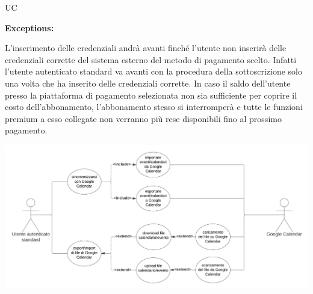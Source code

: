 \begin{listaPersonale}{UC}
\begin{listaPersonale2}[UC] {}
        \textbf{Exceptions:}
        \begin{enumerate}[label=\textbf{[exception \arabic{enumiii}]}, ref= \textbf{[exception \arabic{enumiii}]}]
             L'inserimento delle credenziali andrà avanti finché l'utente non inserirà delle credenziali corrette del sistema esterno del metodo di pagamento scelto. Infatti l'utente autenticato standard va avanti con la procedura della sottoscrizione solo una volta che ha inserito delle credenziali corrette.
             In caso il saldo dell'utente presso la piattaforma di pagamento selezionata non sia sufficiente per coprire il costo dell'abbonamento, l'abbonamento stesso si interromperà e tutte le funzioni premium a esso collegate non verranno più rese disponibili fino al prossimo pagamento.
        \end{enumerate}

        \newpage

        \begin{center}
            \includegraphics[width=1\textwidth]{img/Diagrammi/UseCases/GoogleCalendar.png}
        \end{center}


\end{listaPersonale2}
\end{listaPersonale}
